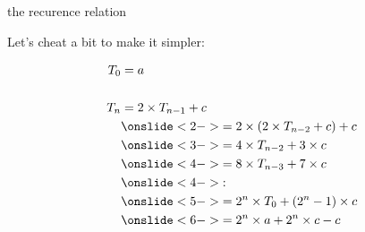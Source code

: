 \begin{frame}{the recurence relation}

  Let's cheat a bit to make it simpler:

  \vspace{5pt}\pause

    \begin{equation}  
  \begin{split}
    T_0 & = a \\
    \\
T_n & = 2 \times T_{n-1} + c \\
    &\onslide<2->{ = 2 \times ( 2 \times T_{n-2} + c ) + c }\\
    &\onslide<3->{ = 4 \times T_{n-2} + 3 \times c }\\
    &\onslide<4->{ = 8 \times T_{n-3} + 7 \times c}\\
    &\onslide<4->{ : }\\
    &\onslide<5->{ = 2^n \times T_0 +  (2^n -1) \times c }\\
    &\onslide<6->{ = 2^n \times a +  2^n \times c  - c}\\
  \end{split}
\end{equation}

\vspace{5pt}\pause
{}


\end{frame}


